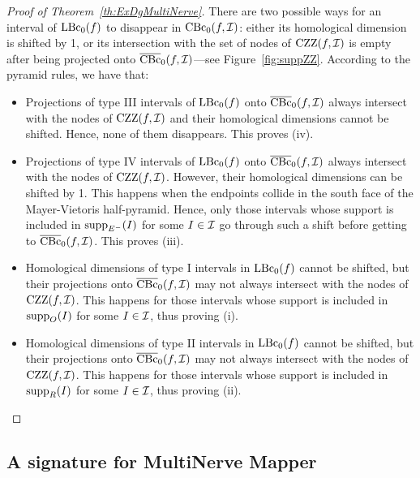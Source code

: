 \begin{proof}[Proof of Theorem~\ref{th:ExDgMultiNerve}]
There are two possible ways for an interval of $\mathrm{LBc}_0(f)$ to disappear in $\mathrm{CBc}_0(f,\mathcal{I})$: 
either its homological dimension is shifted by 1, or its intersection with the set of nodes of $\mathrm{CZZ}(f,\mathcal{I})$ is empty
after being projected onto $\overline{\mathrm{CBc}}_0(f,\mathcal{I})$---see Figure~\ref{fig:suppZZ}.
According to the pyramid rules, we have that:
\begin{itemize}
\item Projections of type III intervals of $\mathrm{LBc}_0(f)$ onto $\overline{\mathrm{CBc}}_0(f,\mathcal{I})$ always intersect with the nodes of $\mathrm{CZZ}(f,\mathcal{I})$
and their homological dimensions cannot be shifted.
Hence, none of them disappears. This proves (iv).
\item Projections of type IV intervals of $\mathrm{LBc}_0(f)$ onto $\overline{\mathrm{CBc}}_0(f,\mathcal{I})$ always intersect with the nodes of $\mathrm{CZZ}(f,\mathcal{I})$.
However, their homological dimensions can be shifted by 1.
This happens when the endpoints collide in the south face of the Mayer-Vietoris half-pyramid. Hence, only those intervals whose support 
is included in ${\rm supp}_{E^-}(I)$ for some $I\in\mathcal{I}$
go through such a shift before getting to $\overline{\mathrm{CBc}}_0(f,\mathcal{I})$. This proves (iii).
\item Homological dimensions of type I intervals in $\mathrm{LBc}_0(f)$ cannot be shifted, but their projections onto $\overline{\mathrm{CBc}}_0(f,\mathcal{I})$ may 
not always intersect with the nodes of $\mathrm{CZZ}(f,\mathcal{I})$.
This happens for those intervals whose support is included in ${\rm supp}_{O}(I)$ for some $I\in\mathcal{I}$, thus proving (i). 
\item Homological dimensions of type II intervals in $\mathrm{LBc}_0(f)$ cannot be shifted, but their projections onto $\overline{\mathrm{CBc}}_0(f,\mathcal{I})$ may
not always intersect with the nodes of $\mathrm{CZZ}(f,\mathcal{I})$. 
This happens for those intervals whose support is included in ${\rm supp}_{R}(I)$ for some $I\in\mathcal{I}$, thus proving (ii). 
\end{itemize}
\end{proof}


\subsection{A signature for MultiNerve Mapper} 
\label{sec:MultiNerveSign}

